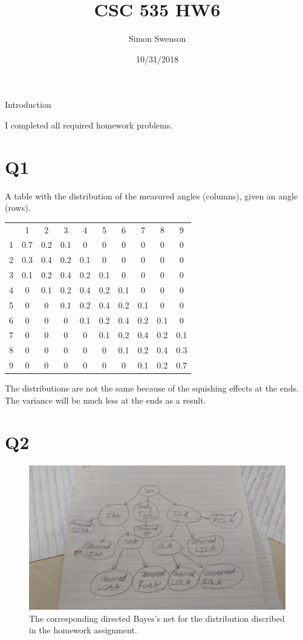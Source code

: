 \documentclass{article}
\title{CSC 535 HW6}
\date{10/31/2018}
\author{Simon Swenson}
\begin{document}
\maketitle
{}

\large Introduction

\small I completed all required homework problems.

\section{Q1}

A table with the distribution of the measured angles (columns), given an angle 
(rows).

\begin{tabular}{r | c c c c c c c c c}
      & 1   & 2   & 3   & 4   & 5   & 6   & 7   & 8   & 9   \\
    1 & 0.7 & 0.2 & 0.1 & 0   & 0   & 0   & 0   & 0   & 0   \\
    2 & 0.3 & 0.4 & 0.2 & 0.1 & 0   & 0   & 0   & 0   & 0   \\
    3 & 0.1 & 0.2 & 0.4 & 0.2 & 0.1 & 0   & 0   & 0   & 0   \\
    4 & 0   & 0.1 & 0.2 & 0.4 & 0.2 & 0.1 & 0   & 0   & 0   \\
    5 & 0   & 0   & 0.1 & 0.2 & 0.4 & 0.2 & 0.1 & 0   & 0   \\
    6 & 0   & 0   & 0   & 0.1 & 0.2 & 0.4 & 0.2 & 0.1 & 0   \\
    7 & 0   & 0   & 0   & 0   & 0.1 & 0.2 & 0.4 & 0.2 & 0.1 \\
    8 & 0   & 0   & 0   & 0   & 0   & 0.1 & 0.2 & 0.4 & 0.3 \\
    9 & 0   & 0   & 0   & 0   & 0   & 0   & 0.1 & 0.2 & 0.7 \\
\end{tabular}

The distributions are not the same because of the squishing effects at the ends.
The variance will be much less at the ends as a result.

\section{Q2}

\begin{figure}[!ht]
	\centering
	\includegraphics[width=120mm]{figs/mql-pgm.jpg}
	\caption{The corresponding directed Bayes's net for the distribution 
        discribed in the homework assignment.}
\end{figure}
\end{document}
